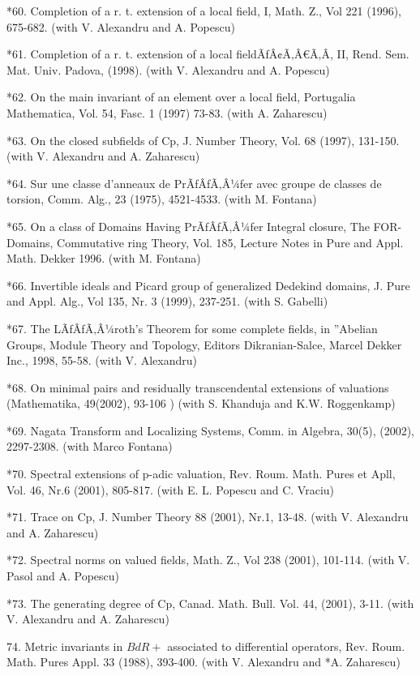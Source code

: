 \documentclass[12pt]{article}
\theoremstyle{plain}
\theoremstyle{definition}
\numberwithin{equation}{section}
\begin{document}
*60.    Completion of a r. t. extension of a local field, I, Math. Z., Vol 221 (1996), 675-682. (with V. Alexandru and A. Popescu) 

*61.    Completion of a r. t. extension of a local fieldÃƒÂ¢Ã‚Â€Ã‚Â, II, Rend. Sem. Mat. Univ. Padova, (1998). (with V. Alexandru and A. Popescu)
 
*62.    On the main invariant of an element over a local field, Portugalia Mathematica, Vol. 54, Fasc. 1 (1997) 73-83. (with A. Zaharescu) 

*63.    On the closed subfields of Cp, J. Number Theory, Vol. 68 (1997), 131-150. (with V. Alexandru and A. Zaharescu) 

*64.    Sur une classe d'anneaux de PrÃƒÂƒÃ‚Â¼fer avec groupe de classes de torsion, Comm. Alg., 23 (1975), 4521-4533. (with M. Fontana)
 
*65.    On a class of Domains Having PrÃƒÂƒÃ‚Â¼fer Integral closure, The FOR-Domains, Commutative ring Theory, Vol. 185, Lecture Notes in Pure and Appl. Math. Dekker 1996. (with M. Fontana) 

*66.    Invertible ideals and Picard group of generalized Dedekind domains, J. Pure and Appl. Alg., Vol 135, Nr. 3 (1999), 237-251. (with S. Gabelli) 

*67.    The LÃƒÂƒÃ‚Â¼roth's Theorem for some complete fields, in ''Abelian Groups, Module Theory and Topology, Editors Dikranian-Salce, Marcel Dekker Inc., 1998, 55-58. (with V. Alexandru)
 
*68.    On minimal pairs and residually transcendental extensions of valuations (Mathematika, 49(2002), 93-106 ) (with S. Khanduja and K.W. Roggenkamp) 

*69.    Nagata Transform and Localizing Systems, Comm. in Algebra, 30(5), (2002), 2297-2308. (with Marco Fontana) 

*70.    Spectral extensions of p-adic valuation, Rev. Roum. Math. Pures et Apll, Vol. 46, Nr.6 (2001), 805-817. (with E. L. Popescu and C. Vraciu) 

*71.    Trace on Cp, J. Number Theory 88 (2001), Nr.1, 13-48. (with V. Alexandru and A. Zaharescu) 

*72.    Spectral norms on valued fields, Math. Z., Vol 238 (2001), 101-114. (with V. Pasol and A. Popescu) 

*73.    The generating degree of Cp, Canad. Math. Bull. Vol. 44, (2001), 3-11. (with V. Alexandru and A. Zaharescu)
 
74.     Metric invariants in $BdR+$ associated to differential operators, Rev. Roum. Math. Pures Appl. 33 (1988), 393-400. (with V. Alexandru and *A. Zaharescu) 
\end{document}
